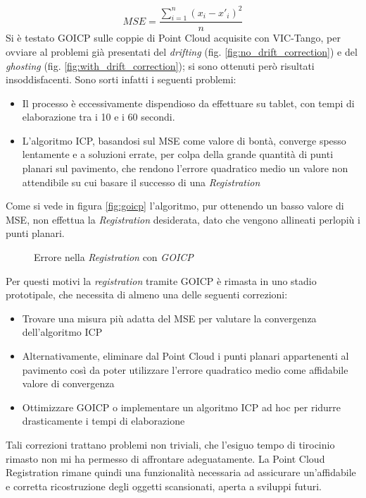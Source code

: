 $$
	MSE = \displaystyle\frac{\sum_{i=1}^{n} (x_i - x'_i)^2}{ n }
$$
Si è testato GOICP sulle coppie di Point Cloud acquisite con VIC-Tango, per ovviare al problemi già presentati del \emph{drifting} (fig. \ref{fig:no_drift_correction}) e del \emph{ghosting} (fig. \ref{fig:with_drift_correction}); si sono ottenuti però risultati insoddisfacenti. Sono sorti infatti i seguenti problemi:
\begin{itemize}
\item Il processo è eccessivamente dispendioso da effettuare su tablet, con tempi di elaborazione tra i 10 e i 60 secondi.
\item L'algoritmo ICP, basandosi sul MSE come valore di bontà, converge spesso lentamente e  a soluzioni errate, per colpa della grande quantità di punti planari sul pavimento, che rendono l'errore quadratico medio un valore non attendibile su cui basare il successo di una \emph{Registration} 
\end{itemize}
Come si vede in figura \ref{fig:goicp} l'algoritmo, pur ottenendo un basso valore di MSE, non effettua la \emph{Registration} desiderata, dato che vengono allineati perlopiù i punti planari.
\begin{figure}[htp] 
    \centering
    \hfill%
    \hfill%
    \caption{Errore nella \emph{Registration} con \emph{GOICP}}
\end{figure}
\newline

\noindent
Per questi motivi la \emph{registration} tramite GOICP è rimasta in uno stadio prototipale, che necessita di almeno una delle seguenti correzioni:
\begin{itemize}
\item Trovare una misura più adatta del MSE per valutare la convergenza dell'algoritmo ICP
\item Alternativamente, eliminare dal Point Cloud i punti planari appartenenti al pavimento così da poter utilizzare l'errore quadratico medio come affidabile valore di convergenza
\item Ottimizzare GOICP o implementare un algoritmo ICP ad hoc per ridurre drasticamente i tempi di elaborazione
\end{itemize}
\noindent
Tali correzioni trattano problemi non triviali, che l'esiguo tempo di tirocinio rimasto non mi ha permesso di affrontare adeguatamente. La Point Cloud Registration rimane quindi una funzionalità necessaria ad assicurare un'affidabile e corretta ricostruzione degli oggetti scansionati, aperta a sviluppi futuri.

